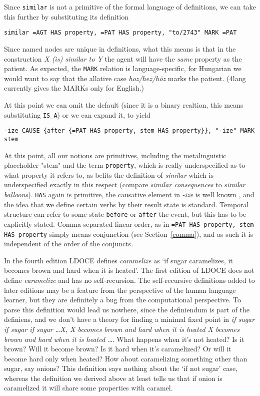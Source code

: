 \documentclass[11pt,bookmarks,bookmarksnumbered,naturalnames,plainpages=false,pdftex,colorlinks=true,urlcolor=blue,bookmarksdepth=subsection,plainpages=false]{paper}
\begin{document}
Since {\tt similar} is not a primitive of the formal language of definitions,
we can take this further by substituting its definition 

\begin{verbatim}
similar =AGT HAS property, =PAT HAS property, "to/2743" MARK =PAT
\end{verbatim}

\noindent
Since named nodes are unique in definitions, what this means is that in the
construction {\it X (is) similar to Y} the agent will have the {\it same}
property as the patient. As expected, the {\tt MARK} relation is
language-specific, for Hungarian we would want to say that the allative case
{\it hoz/hez/h\"{o}z} marks the patient. (4lang currently gives the MARKs only
for English.) 

At this point we can omit the default (since it is a binary realtion, this
means substituting {\tt IS\_A}) or we can expand it, to yield 

\begin{verbatim}
-ize CAUSE {after {=PAT HAS property, stem HAS property}}, "-ize" MARK stem
\end{verbatim}

\noindent At this point, all our notions are primitives, including the
metalinguistic placeholder "stem" and the term {\tt property}, which is really
underspecified as to what property it refers to, as befits the definition of
{\it similar} which is underspecified exactly in this respect (compare {\it
  similar consequences} to {\it similar balloons}). {\tt HAS} again is
primitive, the causative element in {\it -ize} is well known
\citep{Lieber:1992,Plag:1998}, and the idea that we define certain verbs by
their result state is standard. Temporal structure can refer to some state
{\tt before} or {\tt after} the event, but this has to be explicitly
stated. Comma-separated linear order, as in {\tt =PAT HAS property, stem HAS
  property} simply means conjunction (see Section~\ref{comma}), and as such 
it is independent of the order of the conjuncts. 

In the fourth edition \citep{Bullon:2003} LDOCE defines {\it caramelize} as
`if sugar caramelizes, it becomes brown and hard when it is heated'.  The
first edition of LDOCE \citep{Procter:1978} does not define {\it caramelize}
and has no self-recursion. The self-recursive definitions added to later
editions may be a feature from the perspective of the human language learner,
but they are definitely a bug from the computational perspective.  To parse this
definition would lead us nowhere, since the definiendum is part of the
definiens, and we don't have a theory for finding a minimal fixed point in
{\it if sugar if sugar if sugar \ldots X, X becomes brown and hard when it is
  heated X becomes brown and hard when it is heated \ldots}. What happens when
it's not heated? Is it brown? Will it become brown? Is it hard when it's
caramelized? Or will it become hard only when heated? How about caramelizing
something other than sugar, say onions? This definition says nothing about the
`if not sugar' case, whereas the definition we derived above at least tells us
that if onion is caramelized it will share some properties with caramel.
\end{document}
